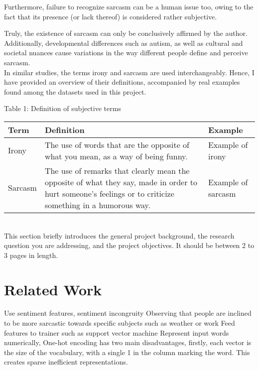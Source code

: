 \documentclass[12pt,a4paper]{article}
\begin{document}
Furthermore, failure to recognize sarcasm can be a human issue too, owing to the fact that its presence (or lack thereof) is considered rather subjective.

Truly, the existence of sarcasm can only be conclusively affirmed by the author. Additionally, developmental differences such as autism, as well as cultural and societal nuances cause variations in the way different people define and perceive sarcasm. \\

In similar studies, the terms irony and sarcasm are used interchangeably. Hence, I have provided an overview of their definitions, accompanied by real examples found among the datasets used in this project.

\begin{center}
	Table 1: Definition of subjective terms
\end{center}
\begin{tabular}{p{3cm}p{8cm}p{5cm}}
	\hline
	\textbf{Term} & \textbf{Definition} & \textbf{Example}\\
	\hline\hline
	Irony & The use of words that are the opposite of what you mean, as a way of being funny. \cite{cambridgeirony2019} &  Example of irony\\
	\hline
	Sarcasm & The use of remarks that clearly mean the opposite of what they say, made in order to hurt someone's feelings or to criticize something in a humorous way. \cite{cambridgesarcasm2019} &  Example of sarcasm\\
	\hline
\end{tabular}\\

This section briefly introduces the general project background, the research question you are addressing, and the project objectives.  It should be between 2 to 3 pages in length.\\



\section{Related Work}
Use sentiment features, sentiment incongruity
Observing that people are inclined to be more sarcastic towards specific subjects such as weather or work
Feed features to trainer such as support vector machine
Represent input words numerically, 
One-hot encoding has two main disadvantages, firstly, each vector is the size of the vocabulary, with a single 1 in the column marking the word. This creates sparse inefficient representations.
\end{document}
